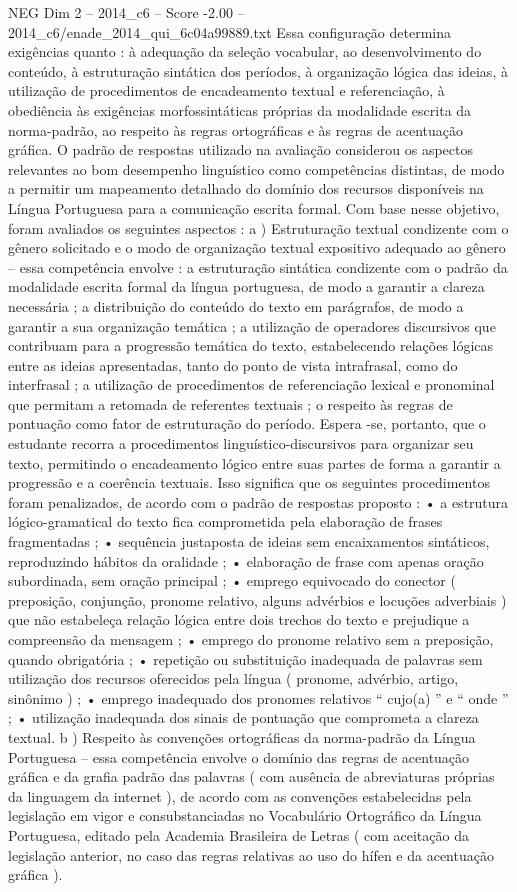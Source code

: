 \begin{textsample}{NEG Dim 2 – 2014\_c6 – Score -2.00 – 2014\_c6/enade\_2014\_qui\_6c04a99889.txt}
Essa configuração determina exigências quanto : à adequação da seleção vocabular, ao desenvolvimento do conteúdo, à estruturação sintática dos períodos, à organização lógica das ideias, à utilização de procedimentos de encadeamento textual e referenciação, à obediência às exigências morfossintáticas próprias da modalidade escrita da norma-padrão, ao respeito às regras ortográficas e às regras de acentuação gráfica.
O padrão de respostas utilizado na avaliação considerou os aspectos relevantes ao bom desempenho linguístico como competências distintas, de modo a permitir um mapeamento detalhado do domínio dos recursos disponíveis na Língua Portuguesa para a comunicação escrita formal.
Com base nesse objetivo, foram avaliados os seguintes aspectos : a ) Estruturação textual condizente com o gênero solicitado e o modo de organização textual expositivo adequado ao gênero – essa competência envolve : a estruturação sintática condizente com o padrão da modalidade escrita formal da língua portuguesa, de modo a garantir a clareza necessária ; a distribuição do conteúdo do texto em parágrafos, de modo a garantir a sua organização temática ; a utilização de operadores discursivos que contribuam para a progressão temática do texto, estabelecendo relações lógicas entre as ideias apresentadas, tanto do ponto de vista intrafrasal, como do interfrasal ; a utilização de procedimentos de referenciação lexical e pronominal que permitam a retomada de referentes textuais ; o respeito às regras de pontuação como fator de estruturação do período.
Espera -se, portanto, que o estudante recorra a procedimentos linguístico-discursivos para organizar seu texto, permitindo o encadeamento lógico entre suas partes de forma a garantir a progressão e a coerência textuais.
Isso significa que os seguintes procedimentos foram penalizados, de acordo com o padrão de respostas proposto : • a estrutura lógico-gramatical do texto fica comprometida pela elaboração de frases fragmentadas ; • sequência justaposta de ideias sem encaixamentos sintáticos, reproduzindo hábitos da oralidade ; • elaboração de frase com apenas oração subordinada, sem oração principal ; • emprego equivocado do conector ( preposição, conjunção, pronome relativo, alguns advérbios e locuções adverbiais ) que não estabeleça relação lógica entre dois trechos do texto e prejudique a compreensão da mensagem ; • emprego do pronome relativo sem a preposição, quando obrigatória ; • repetição ou substituição inadequada de palavras sem utilização dos recursos oferecidos pela língua ( pronome, advérbio, artigo, sinônimo ) ; • emprego inadequado dos pronomes relativos “ cujo(a) ” e “ onde ” ; • utilização inadequada dos sinais de pontuação que comprometa a clareza textual. b ) Respeito às convenções ortográficas da norma-padrão da Língua Portuguesa – essa competência envolve o domínio das regras de acentuação gráfica e da grafia padrão das palavras ( com ausência de abreviaturas próprias da linguagem da internet ), de acordo com as convenções estabelecidas pela legislação em vigor e consubstanciadas no Vocabulário Ortográfico da Língua Portuguesa, editado pela Academia Brasileira de Letras ( com aceitação da legislação anterior, no caso das regras relativas ao uso do hífen e da acentuação gráfica ).

\end{textsample}
